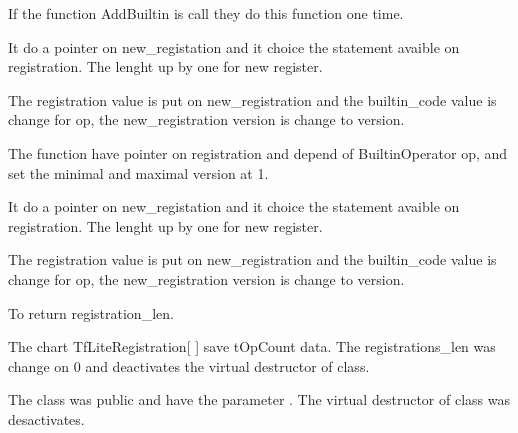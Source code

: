 If the function AddBuiltin is call they do this function one time. 

It do a pointer on new\_registation and it choice the statement avaible on registration. The lenght up by one for new register. 

The registration value is put on new\_registration and the builtin\_code value is change for op, the new\_registration version is change to version.  

\begin{center}
    \label{Figure:MicroErrorRep}
\end{center}

The function  have pointer on registration and depend of BuiltinOperator op, and set the minimal and maximal version at 1. 



It do a pointer on new\_registation and it choice the statement avaible on registration. The lenght up by one for new register. 

The registration value is put on new\_registration and the builtin\_code value is change for op, the new\_registration version is change to version.  

\begin{center}
    \label{Figure:MicroErrorRep}
\end{center}

To  return registration\_len. 

The chart TfLiteRegistration[ ] save tOpCount data. The registrations\_len was change on 0 and  deactivates the virtual destructor of class. 

The class  was public and have the parameter . The virtual destructor of class was desactivates.

\begin{center}
    \label{Figure:MicroErrorRep}
\end{center}


